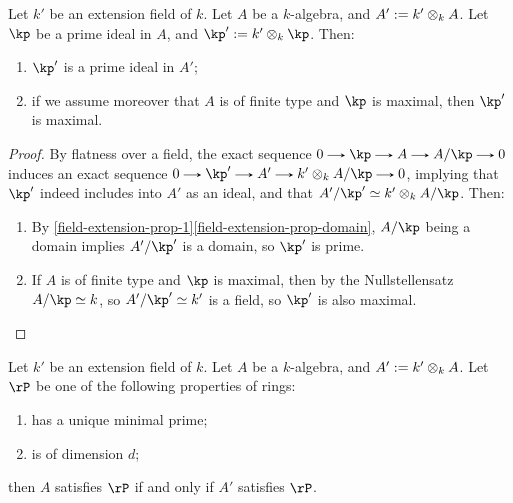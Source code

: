 \begin{lemma}
  \label{field-extension-ideal}
  Let $k'$ be an extension field of $k$. Let $A$ be a $k$-algebra, and $A' \mathrel{:=} k' \otimes_k A$. Let $\kp$ be a prime ideal in $A$, and $\kp' \ce k' \otimes_k \kp$. Then:
  \begin{enumerate}
  \item \label{field-extension-ideal-prime} $\kp'$ is a prime ideal in $A'$;
  \item \label{field-extension-ideal-maximal} if we assume moreover that $A$ is of finite type and $\kp$ is maximal, then $\kp'$ is maximal.
  \end{enumerate}
\end{lemma}

\begin{proof}
  By flatness over a field, the exact sequence $0 \to \kp \to A \to A/\kp \to 0$ induces an exact sequence $0 \to \kp' \to A' \to k' \otimes_k A/\kp \to 0$, implying that $\kp'$ indeed includes into $A'$ as an ideal, and that $A'/\kp' \iso k' \otimes_k A/\kp$. Then:
  \begin{enumerate}
  \item By \cref{field-extension-prop-1}\cref{field-extension-prop-domain}, $A/\kp$ being a domain implies $A'/\kp'$ is a domain, so $\kp'$ is prime.
  \item If $A$ is of finite type and $\kp$ is maximal, then by the Nullstellensatz $A/\kp \iso k$, so $A'/\kp' \iso k'$ is a field, so $\kp'$ is also maximal. \qedhere
  \end{enumerate}
\end{proof}

\begin{proposition}
  \label{field-extension-prop-2}
  Let $k'$ be an extension field of $k$. Let $A$ be a $k$-algebra, and $A' \mathrel{:=} k' \otimes_k A$. Let $\rP$ be one of the following properties of rings:
  \begin{enumerate}
  \item \label{field-extension-prop-irreducible} has a unique minimal prime;
  \item \label{field-extension-prop-dimension} is of dimension $d$;
  \end{enumerate}
  then $A$ satisfies $\rP$ if and only if $A'$ satisfies $\rP$.
\end{proposition}

